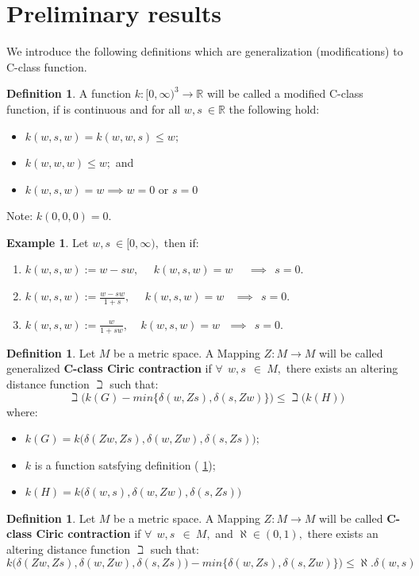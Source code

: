 \documentclass[11pt,reqno]{amsart}
\theoremstyle{definition}
\newtheorem{definition}[theorem]{Definition}
\newtheorem{example}[theorem]{Example}
\theoremstyle{remark}
\numberwithin{equation}{section}
\begin{document}
	\section{Preliminary results}
	We introduce the following definitions which are generalization (modifications) to C-class function.\\ 
	\begin{definition}\label{defn1}
		A function $k:[0, \infty)^3 \to \mathbb{R}$ will be called a modified C-class function, if is continuous and for all $w, s~\in \mathbb{R} $  the following hold:\\
		\begin{itemize}
			\item $k(w,s,w) = k(w,w,s) \leq w;$
			\item  $k(w,w,w)\leq w;$ and
			\item $k(w,s,w)=w \implies w=0$ or $s=0$
			
		\end{itemize} 
	\end{definition}
	Note: $k(0,0,0)=0.$
	\begin{example}
		Let $w,s~\in [0, \infty),$ then if:
		\begin{enumerate}
			\item $k(w,s,w) := w-sw,~~~~~~k(w,s,w) = w~~~~~~\implies ~~s =0.$
			\item $k(w,s,w):= \frac{w -sw}{1+s},~~~~~~k(w,s,w) = w~~~~\implies ~~s =0.$
			\item $k(w,s,w):= \frac{w}{1+sw},~~~~~k(w,s,w) = w~~~\implies~~s =0.$
		\end{enumerate}
	\end{example}
	\begin{definition}\label{defn2}
		Let $M$ be a metric space. A Mapping $Z: M \to M$ will be called generalized  \textbf{C-class Ciric contraction} if $\forall~~w,s~~\in~M,$ there exists an altering distance function $\beth$ such that:
		\begin{equation}\label{eqn1}
			\beth \Big(k(G)- min\{\delta(w,Zs), \delta(s, Zw)\}\Big) \leq \beth\Big(k(H)\Big)
		\end{equation}
		where:
		\begin{itemize}
			\item $k(G) = k\Big( \delta(Zw,Zs), \delta(w,Zw), \delta(s, Zs)\Big);$
			\item $k$ is a function satsfying definition ( \ref{defn1});
			\item $k(H)= k\Big(\delta(w,s), \delta(w,Zw), \delta(s,Zs) \Big)$
		\end{itemize}
	\end{definition}
		\begin{definition}\label{defn3}
		Let $M$ be a metric space. A Mapping $Z: M \to M$ will be called  \textbf{C-class Ciric contraction} if $\forall~~w,s~~\in~M,$ and $\aleph \in (0,1),$ there exists an altering distance function $\beth$ such that:
		\begin{equation}\label{eqn2.2}
			k\Big( \delta(Zw,Zs), \delta(w,Zw), \delta(s, Zs)\Big)- min\{\delta(w,Zs), \delta(s, Zw)\}\Big) \leq \aleph.\delta(w,s)
		\end{equation}
		\end{definition}
	
\end{document}
